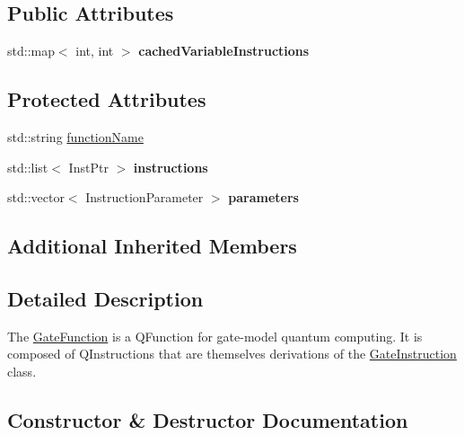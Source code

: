 \subsection*{Public Attributes}
\begin{DoxyCompactItemize}
\item 
std\+::map$<$ int, int $>$ {\bfseries cached\+Variable\+Instructions}\hypertarget{a00111_a3ddfd3bd757fc47544f03e2609d703e0}{}\label{a00111_a3ddfd3bd757fc47544f03e2609d703e0}

\end{DoxyCompactItemize}
\subsection*{Protected Attributes}
\begin{DoxyCompactItemize}
\item 
std\+::string \hyperlink{a00111_aea17cb1ca610bb5b8eadb0642c32b937}{function\+Name}
\item 
std\+::list$<$ Inst\+Ptr $>$ {\bfseries instructions}\hypertarget{a00111_aa2334b23541206ed02023ec28f5e4ac7}{}\label{a00111_aa2334b23541206ed02023ec28f5e4ac7}

\item 
std\+::vector$<$ Instruction\+Parameter $>$ {\bfseries parameters}\hypertarget{a00111_a2f53b483afa8d6b357f2550b8f1a3a9c}{}\label{a00111_a2f53b483afa8d6b357f2550b8f1a3a9c}

\end{DoxyCompactItemize}
\subsection*{Additional Inherited Members}


\subsection{Detailed Description}
The \hyperlink{a00111}{Gate\+Function} is a Q\+Function for gate-\/model quantum computing. It is composed of Q\+Instructions that are themselves derivations of the \hyperlink{a00112}{Gate\+Instruction} class. 

\subsection{Constructor \& Destructor Documentation}

